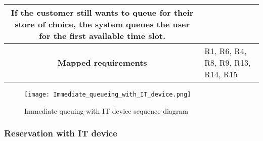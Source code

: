 \documentclass[../../main.tex]{subfiles}
\begin{document}
\begin{table}[H]
\begin{tabular}{c m{}}
                                If the customer still wants to queue for their store of choice, the system queues the user for the first available time slot. \\ \hline
          \textbf{Mapped requirements} & R1, R6, R4, R8, R9, R13, R14, R15\\ \hline
          \end{tabular}
      \end{table}

      \begin{figure}[H]
        \centering
        \texttt{[image: Immediate\_queueing\_with\_IT\_device.png]}
        \caption{Immediate queuing with IT device sequence diagram}
      \end{figure}

      \subsubsection{Reservation with IT device}
\end{document}
